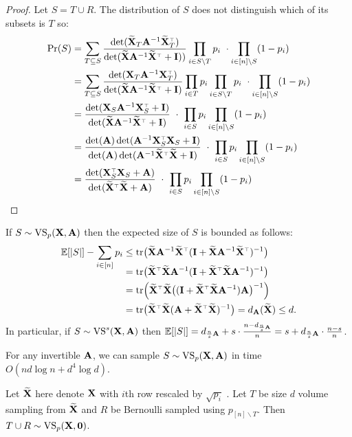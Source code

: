 \documentclass[12pt]{sty/colt2019/colt2018-arxiv}
\begin{document}
\begin{proof}
  Let $S=T\cup R$. The distribution of $S$ does not
  distinguish which of its subsets is $T$ so:
  \begin{align*}
    \Pr(S) &= \sum_{T\subseteq S}\frac{\det(\Xt_T\A^{-1}\Xt_T^\top)}{\det(\Xt\A^{-1}\Xt^\top+\I))}\prod_{i\in
    S\backslash T} p_i\ \cdot \prod_{i\in[n]\backslash S}(1-p_i)
\\ &=\sum_{T\subseteq S}\frac{\det(\X_T\A^{-1}\X_T^\top)}{\det(\Xt\A^{-1}\Xt^\top+\I)}\prod_{i\in T}p_i\prod_{i\in
    S\backslash T} p_i\ \cdot \prod_{i\in[n]\backslash S}(1-p_i)
\\ &=\frac{\det(\X_S\A^{-1}\X_S^\top+\I)}{\det(\Xt\A^{-1}\Xt^\top+\I)}\ \cdot\ \prod_{i\in
     S} p_i \prod_{i\in[n]\backslash S}(1-p_i)
\\ &=\frac{\det(\A)\det(\A^{-1}\X_S^\top\X_S+\I)}{\det(\A)\det(\A^{-1}\Xt^\top\Xt+\I)}\ \cdot\ \prod_{i\in
     S} p_i \prod_{i\in[n]\backslash S}(1-p_i)
\\ &=\frac{\det(\X_S^\top\X_S+\A)}{\det(\Xt^\top\Xt+\A)}\ \cdot\ \prod_{i\in
     S} p_i \prod_{i\in[n]\backslash S}(1-p_i)
  \end{align*}
\end{proof}
\begin{remark}
  If $S\sim {\mathrm{VS}}_p(\mathbf X,\mathbf A)$ then the expected size of $S$ is bounded as
  follows:
  \begin{align*}
    \E[|S|] -\sum_{i\in[n]}p_i  &\leq
              \tr\big(\Xt\A^{-1}\Xt^\top(\I+\Xt\A^{-1}\Xt^\top)^{-1}\big)
    \\[-3mm] &=\tr\big(\Xt^\top\Xt\A^{-1}(\I+\Xt^\top\Xt\A^{-1})^{-1}\big)
    \\ &=\tr\Big(\Xt^\top\Xt\big((\I+\Xt^\top\Xt\A^{-1})\A\big)^{-1}\Big)
\\ &=\tr\big(\Xt^\top\Xt(\A+\Xt^\top\Xt)^{-1}\big) = d_{\A}(\Xt)\leq d.
  \end{align*}
In particular, if $S\sim {\mathrm{VS}}^s(\mathbf X,\mathbf A)$ then $\mathbb E[|S|] = d_{\frac ns\mathbf A} + s\cdot
\frac{n-d_{\frac ns\mathbf A}}n = s + d_{\frac ns\mathbf A}\cdot \frac{n-s}{n}$.    
\end{remark}
\begin{corollary}
For any invertible $\mathbf A$,  we can sample $S\sim{\mathrm{VS}}_p(\mathbf X,\mathbf A)$ in time
$O(nd\log n +d^4\log d)$.
\end{corollary}
\begin{theorem}\label{t:composition}
Let $\widetilde{\mathbf{X}}$ here denote $\mathbf X$ with $i$th row rescaled by $\sqrt{p_i}$ . Let $T$ be size $d$ volume sampling from $\widetilde{\mathbf{X}}$ and $R$ be Bernoulli
sampled using $p_{[n]\backslash T}$. Then $T\cup R\sim {\mathrm{VS}}_p(\mathbf X,\mathbf 0)$.
\end{theorem}
\end{document}
